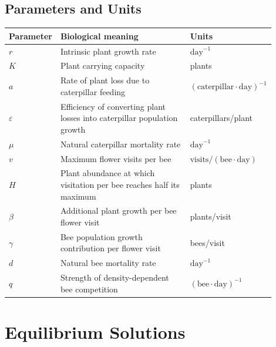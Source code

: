 \documentclass[11pt]{article}
\begin{document}
\subsection{Parameters and Units}
\begin{center}
    \renewcommand{\arraystretch}{1.4}
    \begin{tabular}{@{}p{0.15\linewidth}p{0.49\linewidth}p{0.26\linewidth}@{}}
        \hline
        Parameter & Biological meaning & Units \\
        \hline
        $r$ & Intrinsic plant growth rate & $\mathrm{day}^{-1}$ \\
        $K$ & Plant carrying capacity & plants \\
        $a$ & Rate of plant loss due to caterpillar feeding & $(\mathrm{caterpillar}\cdot\mathrm{day})^{-1}$ \\
        $\varepsilon$ & Efficiency of converting plant losses into caterpillar
        population growth & caterpillars/plant \\
        $\mu$ & Natural caterpillar mortality rate & $\mathrm{day}^{-1}$ \\
        $v$ & Maximum flower visits per bee & $\mathrm{visits}/(\mathrm{bee}\cdot\mathrm{day})$ \\
        $H$ & Plant abundance at which visitation per bee reaches half its
        maximum & plants \\
        $\beta$ & Additional plant growth per bee flower visit & plants/visit \\
        $\gamma$ & Bee population growth contribution per flower visit & bees/visit \\
        $d$ & Natural bee mortality rate & $\mathrm{day}^{-1}$ \\
        $q$ & Strength of density-dependent bee competition & $(\mathrm{bee}\cdot\mathrm{day})^{-1}$ \\
        \hline
    \end{tabular}
\end{center}

\section{Equilibrium Solutions}
\end{document}
